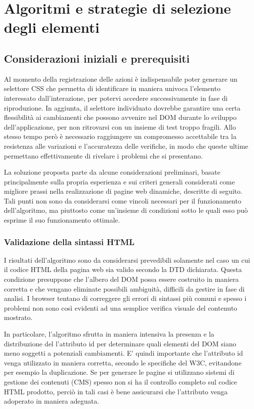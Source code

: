 \chapter{Algoritmi e strategie di selezione degli elementi}

\section{Considerazioni iniziali e prerequisiti}

Al momento della registrazione delle azioni è indispensabile poter generare un selettore CSS che permetta di identificare in maniera univoca l'elemento interessato dall'interazione, per potervi accedere successivamente in fase di riproduzione. In aggiunta, il selettore individuato dovrebbe garantire una certa flessibilità ai cambiamenti che possono avvenire nel DOM durante lo sviluppo dell'applicazione, per non ritrovarsi con un insieme di test troppo fragili.
Allo stesso tempo però è necessario raggiungere un compromesso accettabile tra la resistenza alle variazioni e l'accuratezza delle verifiche, in modo che queste ultime permettano effettivamente di rivelare i problemi che si presentano.

La soluzione proposta parte da alcune considerazioni preliminari, basate principalmente sulla propria esperienza e sui criteri generali considerati come migliore prassi nella realizzazione di pagine web dinamiche, descritte di seguito. Tali punti non sono da considerarsi come vincoli necessari per il funzionamento dell'algoritmo, ma piuttosto come un'insieme di condizioni sotto le quali esso può esprime il suo funzionamento ottimale. 

\subsection {Validazione della sintassi HTML}

I risultati dell'algoritmo sono da considerarsi prevedibili solamente nel caso un cui il codice HTML della pagina web sia valido secondo la DTD dichiarata. Questa condizione presuppone che l'albero del DOM possa essere costruito in maniera corretta e che vengano eliminate possibili ambiguità, difficili da gestire in fase di analisi. I browser tentano di correggere gli errori di sintassi più comuni e spesso i problemi non sono così evidenti ad una semplice verifica visuale del contenuto mostrato. 

In particolare, l'algoritmo sfrutta in maniera intensiva la presenza e la distribuzione del l'attributo id per determinare quali elementi del DOM siano meno soggetti a potenziali cambiamenti. E' quindi importante che l'attributo id venga utilizzato in maniera corretta, secondo le specifiche del W3C, evitandone per esempio la duplicazione. Se per generare le pagine si utilizzano sistemi di gestione dei contenuti (CMS) spesso non si ha il controllo completo sul codice HTML prodotto, perciò in tali casi è bene assicurarsi che l'attributo venga adoperato in maniera adeguata.

